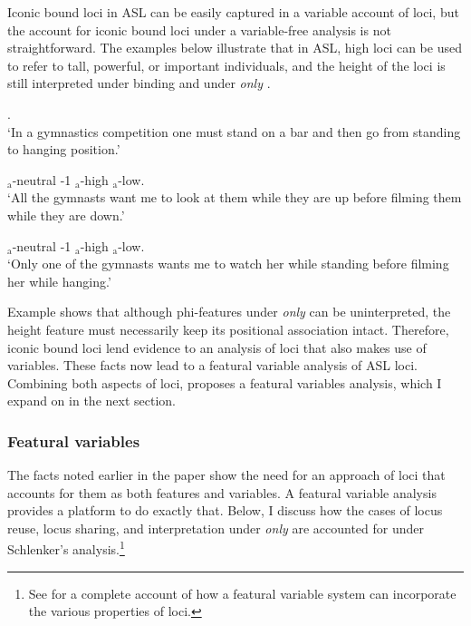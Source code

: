 \documentclass[output=paper,
modfonts
]{langscibook}
\begin{document}
Iconic bound loci in ASL can be easily captured in a variable account of loci, but the account for iconic bound loci under a variable-free analysis is not straightforward. The examples below illustrate that in ASL, high loci can be used to refer to tall, powerful, or important individuals, and the height of the loci is still interpreted under binding and under \textit{only} \citep{Schlenker2014}.

\newpage
\begin{exe}  \label{ex:irani:72}
		\ex {}.\\
		`In a gymnastics competition one must stand on a bar and then go from standing to hanging position.'
	\begin{xlist}	
		\ex  {} $_\text{a}$-{neutral}  -1 $_\text{a}$-{high}  $_\text{a}$-{low}.\\
		`All the gymnasts want me to look at them while they are up before filming them while they are down.'
		
		\ex  {} $_\text{a}$-{neutral}  -1 $_\text{a}$-{high}   $_\text{a}$-{low}. \\
		`Only one of the gymnasts wants me to watch her while standing before filming her while hanging.' \citep[1081]{Schlenker2014}
	\end{xlist}     
\end{exe}

Example  shows that although phi-features under \textit{only} can be uninterpreted, the height feature must necessarily keep its positional association intact. Therefore, iconic bound loci lend evidence to an analysis of loci that also makes use of variables. These facts now lead to a featural variable analysis of ASL loci. Combining both aspects of loci, \citet{Schlenker2014} proposes a featural variables analysis, which I expand on in the next section. 

\subsubsection{Featural variables}

The facts noted earlier in the paper show the need for an approach of loci that accounts for them as both features and variables. A featural variable analysis \citep{Schlenker2014} provides a platform to do exactly that. Below, I discuss how the cases of locus reuse, locus sharing, and interpretation under \textit{only} are accounted for under Schlenker's analysis.\footnote{See \citet{Schlenker2014} for a complete account of how a featural variable system can incorporate the various properties of loci.}  
\end{document}
